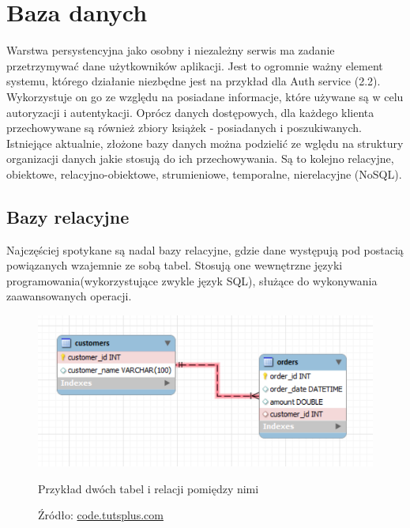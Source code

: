 \section{Baza danych}
Warstwa persystencyjna jako osobny i niezależny serwis ma zadanie przetrzymywać dane użytkowników aplikacji. Jest to ogromnie ważny element systemu, którego działanie niezbędne jest na przykład dla Auth service (2.2). Wykorzystuje on go ze względu na posiadane informacje, które używane są w celu autoryzacji i autentykacji.
Oprócz danych dostępowych, dla każdego klienta przechowywane są również zbiory książek - posiadanych i poszukiwanych.\newline
Istniejące aktualnie, złożone bazy danych można podzielić ze wględu na struktury organizacji danych jakie stosują do ich przechowywania. Są to kolejno relacyjne, obiektowe, relacyjno-obiektowe, strumieniowe, temporalne, nierelacyjne (NoSQL).

\subsection{Bazy relacyjne}
Najczęściej spotykane są nadal bazy relacyjne, gdzie dane występują pod postacią powiązanych wzajemnie ze sobą tabel. Stosują one wewnętrzne języki programowania(wykorzystujące zwykle język SQL), służące do wykonywania zaawansowanych operacji.
\begin{figure}[H]
	\centering
	\includegraphics[width=\linewidth]{relations.pdf}
	\caption{\centering Przykład dwóch tabel i relacji pomiędzy nimi}
	\caption*{\centering Źródło: \url{code.tutsplus.com}}
\end{figure}


